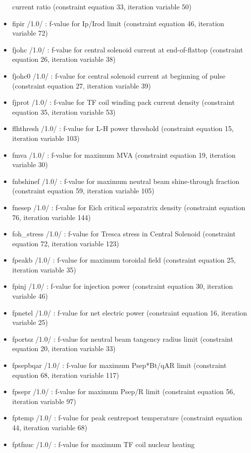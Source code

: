 \documentclass[]{article}
\begin{document}
\begin{itemize}
  current ratio (constraint equation 33, iteration variable 50)
\item
  fipir /1.0/ : f-value for Ip/Irod limit (constraint equation 46,
  iteration variable 72)
\item
  fjohc /1.0/ : f-value for central solenoid current at end-of-flattop
  (constraint equation 26, iteration variable 38)
\item
  fjohc0 /1.0/ : f-value for central solenoid current at beginning of
  pulse (constraint equation 27, iteration variable 39)
\item
  fjprot /1.0/ : f-value for TF coil winding pack current density
  (constraint equation 35, iteration variable 53)
\item
  flhthresh /1.0/ : f-value for L-H power threshold (constraint equation
  15, iteration variable 103)
\item
  fmva /1.0/ : f-value for maximum MVA (constraint equation 19,
  iteration variable 30)
\item
  fnbshinef /1.0/ : f-value for maximum neutral beam shine-through
  fraction (constraint equation 59, iteration variable 105)
\item
  fnesep /1.0/ : f-value for Eich critical separatrix density
  (constraint equation 76, iteration variable 144)
\item
  foh\_stress /1.0/ : f-value for Tresca stress in Central Solenoid
  (constraint equation 72, iteration variable 123)
\item
  fpeakb /1.0/ : f-value for maximum toroidal field (constraint equation
  25, iteration variable 35)
\item
  fpinj /1.0/ : f-value for injection power (constraint equation 30,
  iteration variable 46)
\item
  fpnetel /1.0/ : f-value for net electric power (constraint equation
  16, iteration variable 25)
\item
  fportsz /1.0/ : f-value for neutral beam tangency radius limit
  (constraint equation 20, iteration variable 33)
\item
  fpsepbqar /1.0/ : f-value for maximum Psep*Bt/qAR limit (constraint
  equation 68, iteration variable 117)
\item
  fpsepr /1.0/ : f-value for maximum Psep/R limit (constraint equation
  56, iteration variable 97)
\item
  fptemp /1.0/ : f-value for peak centrepost temperature (constraint
  equation 44, iteration variable 68)
\item
  fptfnuc /1.0/ : f-value for maximum TF coil nuclear heating

\end{itemize}
\end{document}
